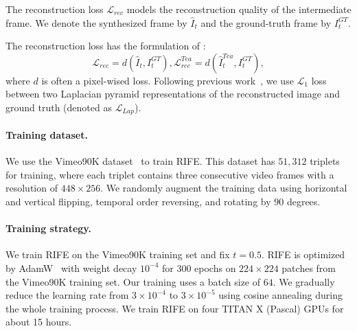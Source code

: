 \documentclass[final]{cvpr}
\begin{document}
The reconstruction loss $\mathcal{L}_{rec}$ models the reconstruction quality of the intermediate frame. We denote the synthesized frame by $\widehat{I}_t$ and the ground-truth frame by ${I}^{GT}_t$.


The reconstruction loss has the formulation of :
\begin{equation}
\mathcal{L}_{rec} = d(\widehat{I}_t, {I}^{GT}_{t}), \mathcal{L}_{rec}^{Tea} = d(\widehat{I}_t^{Tea},  {I}^{GT}_{t}) \label{eq:loss},
\end{equation}
where $d$ is often a pixel-wised loss. Following previous work~\cite{niklaus2018context, niklaus2020softmax}, we use $\mathcal{L}_1$ loss between two Laplacian pyramid representations of the reconstructed image and ground truth (denoted as $\mathcal{L}_{Lap}$).




\paragraph{Training dataset.}
We use the Vimeo90K dataset~\cite{xue2019video} to train RIFE. This dataset has $51,312$ triplets for training, where each triplet contains three consecutive video frames with a resolution of $448\times256$. We randomly augment the training data using horizontal and vertical flipping, temporal order reversing, and rotating by $90$ degrees.

\paragraph{Training strategy.}
We train RIFE on the Vimeo90K training set and fix $t=0.5$. RIFE is optimized by AdamW~\cite{loshchilov2018fixing} with weight decay $10^{-4}$ for $300$ epochs on $224\times224$ patches from the Vimeo90K training set. Our training uses a batch size of $64$. We gradually reduce the learning rate from $3 \times 10^{-4}$ to $3 \times 10^{-5}$ using cosine annealing during the whole training process. We train RIFE on four TITAN X (Pascal) GPUs for about 15 hours. 
\end{document}
